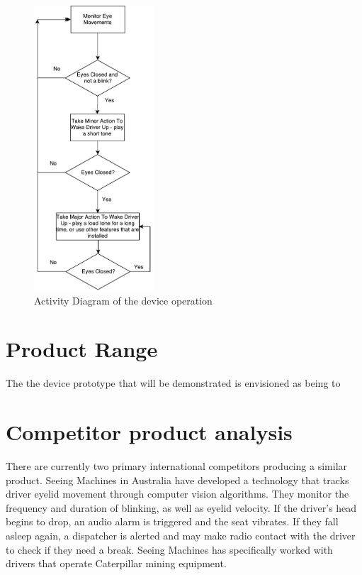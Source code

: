 \begin{itemize}
\begin{figure}[H]
\centering
\includegraphics[width=0.4\textwidth]{images/ProductFlowchart}
\vskip10pt
\caption[Device Operation Activity Diagram]{Activity Diagram of the device operation}
\label{fig:DeviceFlowChart}
\end{figure}

\end{itemize}

\section{Product Range}

The the device prototype that will be demonstrated is envisioned as being to  

\section{Competitor product analysis}
There are currently two primary international competitors producing a similar product. Seeing Machines in Australia have developed a technology that tracks driver eyelid movement through computer vision algorithms. They monitor the frequency and duration of blinking, as well as eyelid velocity. If the driver’s head begins to drop, an audio alarm is triggered and the seat vibrates. If they fall asleep again, a dispatcher is alerted and may make radio contact with the driver to check if they need a break. Seeing Machines has specifically worked with drivers that operate Caterpillar mining equipment.

